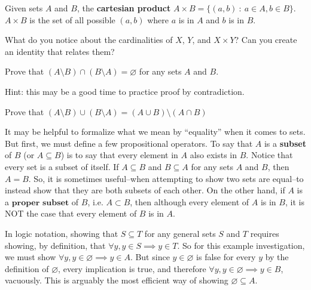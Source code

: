 \begin{definition}
    Given sets $A$ and $B$, the \textbf{cartesian product} $A\times B = \{(a,b)\ :\ a\in A, b\in B\}$. $A\times B$ is the set of all possible $(a,b)$ where $a$ is in $A$ and $b$ is in $B$.
\end{definition}

\begin{exercise}
    What do you notice about the cardinalities of $X$, $Y$, and $X\times Y$? Can you create an identity that relates them?
\end{exercise}
\begin{exercise}
    Prove that $(A\setminus B) \cap (B\setminus A) =\varnothing$ for any sets $A$ and $B$. 
\end{exercise}
Hint: this may be a good time to practice proof by contradiction.
\begin{exercise}
    Prove that $(A\setminus B) \cup (B\setminus A) = (A\cup B) \setminus (A\cap B)$
\end{exercise}

It may be helpful to formalize what we mean by ``equality'' when it comes to sets. But first, we must define a few propositional operators. To say that $A$ is a \textbf{subset} of $B$ (or $A\subseteq B$) is to say that every element in $A$ also exists in $B$. Notice that every set is a subset of itself. If $A\subseteq B$ and $B\subseteq A$ for any sets $A$ and $B$, then $A=B$. So, it is sometimes useful--when attempting to show two sets are equal--to instead show that they are both subsets of each other. On the other hand, if $A$ is a $\textbf{proper subset}$ of $B$, i.e. $A\subset B$, then although every element of $A$ is in $B$, it is NOT the case that every element of $B$ is in $A$. \\

\clearpage
\begin{example}
    In logic notation, showing that $S\subseteq T$ for any general sets $S$ and $T$ requires showing, by definition, that $\forall y, y\in S \implies y\in T$. So for this example investigation, we must show $\forall y, y\in\varnothing \implies y\in A$. But since $y\in\varnothing$ is false for every $y$ by the definition of $\varnothing$, every implication is true, and therefore $\forall y, y\in\varnothing \implies y\in B$, vacuously. This is arguably the most efficient way of showing $\varnothing\subseteq A$.
\end{example}

